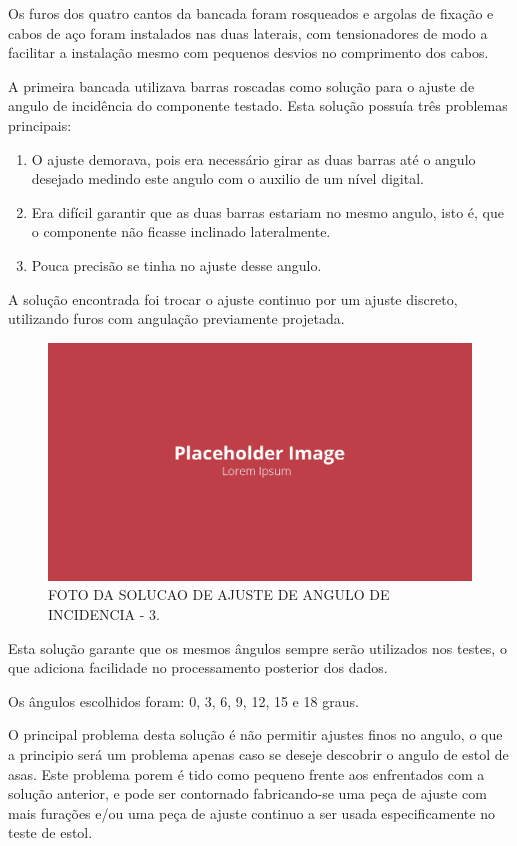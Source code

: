 Os furos dos quatro cantos da bancada foram rosqueados e argolas de fixação e cabos de aço foram instalados nas duas laterais, com tensionadores de modo a facilitar a instalação mesmo com pequenos desvios no comprimento dos cabos.

A primeira bancada utilizava barras roscadas como solução para o ajuste de angulo de incidência do componente testado. Esta solução possuía três problemas principais:

\begin{enumerate}
    \item O ajuste demorava, pois era necessário girar as duas barras até o angulo desejado medindo este angulo com o auxilio de um nível digital.
    \item Era difícil garantir que as duas barras estariam no mesmo angulo, isto é, que o componente não ficasse inclinado lateralmente.
    \item Pouca precisão se tinha no ajuste desse angulo.
\end{enumerate}

A solução encontrada foi trocar o ajuste continuo por um ajuste discreto, utilizando furos com angulação previamente projetada.

\begin{figure}[!ht]
    \centering
    \includegraphics[width=.8\linewidth]{figuras/placeholder.png}
    \caption{FOTO DA SOLUCAO DE AJUSTE DE ANGULO DE INCIDENCIA - 3\cite{autor}.}
    \label{fig:placeholder}
\end{figure}

Esta solução garante que os mesmos ângulos sempre serão utilizados nos testes, o que adiciona facilidade no processamento posterior dos dados.

Os ângulos escolhidos foram: 0, 3, 6, 9, 12, 15 e 18 graus.

O principal problema desta solução é não permitir ajustes finos no angulo, o que a principio será um problema apenas caso se deseje descobrir o angulo de estol de asas. Este problema porem é tido como pequeno frente aos enfrentados com a solução anterior, e pode ser contornado fabricando-se uma peça de ajuste com mais furações e/ou uma peça de ajuste continuo a ser usada especificamente no teste de estol.